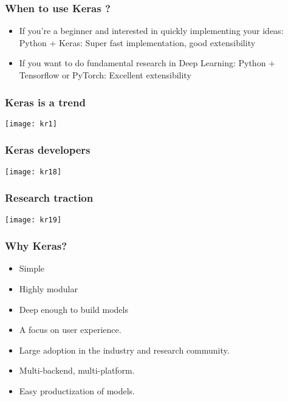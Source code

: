 \begin{frame}[fragile] \frametitle{When to use Keras ?}

\begin{itemize}
\item  If you're a beginner 
and interested in 
quickly implementing 
your ideas:  Python + Keras: Super fast 
implementation, good 
extensibility
\item  If you want to do 
fundamental research 
in Deep Learning:  Python + Tensorflow or 
PyTorch: Excellent 
extensibility
\end{itemize}
\end{frame}



\begin{frame}[fragile] \frametitle{Keras is a trend}
\begin{center}
\texttt{[image: kr1]}
\end{center}

\end{frame}

\begin{frame}[fragile] \frametitle{Keras developers}
\begin{center}
\texttt{[image: kr18]}
\end{center}

\end{frame}

\begin{frame}[fragile] \frametitle{Research traction}
\begin{center}
\texttt{[image: kr19]}
\end{center}

\end{frame}

\begin{frame}[fragile] \frametitle{Why Keras?}

\begin{itemize}
\item  Simple 
\item  Highly modular 
\item  Deep enough to build models
\item  A focus on user experience.
\item  Large adoption in the industry and research community.
\item  Multi-backend, multi-platform.
\item  Easy productization of models.
\end{itemize}
\end{frame}


